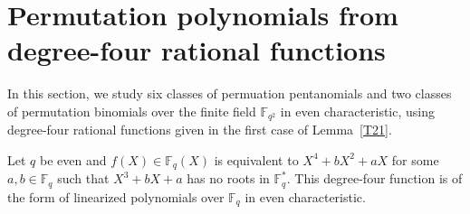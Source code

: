 \documentclass[12pt]{amsart}
\numberwithin{equation}{section}
\theoremstyle{definition}
\newcommand{\F}{\mathbb F}
\begin{document}

\section{Permutation polynomials from degree-four rational functions} \label{S4}
In this section, we study six classes of permuation pentanomials and two classes of permutation  binomials over the finite field $\F_{q^2}$ in even characteristic, using degree-four rational functions given in the first case of Lemma~\ref{T21}.

Let $q$ be even and $f(X) \in \F_q(X)$ is equivalent to $X^4+bX^2+aX$ for some $a,b \in \F_q$ such that $X^3+bX+a$ has no roots in $\F_q^*$. This degree-four function is of the form of linearized polynomials over $\F_q$ in even characteristic.
\end{document}
